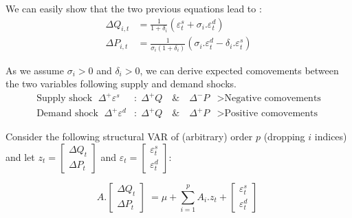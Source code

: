 \noindent We can easily show that the two previous equations lead to :
\begin{align*}
    \Delta Q_{i,t} &= \frac{1}{1+\delta_{i}}(\varepsilon_{t}^{s} + \sigma_{i}.\varepsilon_{t}^{d}) \\
    \Delta P_{i,t} &= \frac{1}{\sigma_{i}(1+\delta_{i})}(\sigma_{i}.\varepsilon_{t}^{d} - \delta_{i}.\varepsilon_{t}^{s})
\end{align*}

\noindent As we assume $\sigma_{i}>0$ and $\delta_{i}>0$, we can derive expected comovements between the two variables following supply and demand shocks.
\begin{align*}
    \textrm{Supply shock } \; \Delta^{+}\varepsilon^{s} &: \; \Delta^{+}Q \quad \textrm{\&} \quad \Delta^{-}P &> \textrm{Negative comovements}\\
    \textrm{Demand shock } \; \Delta^{+}\varepsilon^{d} &: \; \Delta^{+}Q \quad \textrm{\&} \quad \Delta^{+}P &> \textrm{Positive comovements}
\end{align*}


\noindent Consider the following structural VAR of (arbitrary) order $p$ (dropping $i$ indices) and let $z_{t} = \begin{bmatrix} \Delta Q_{t} \\ \Delta P_{t} \end{bmatrix}$ and $\varepsilon_{t} = \begin{bmatrix} \varepsilon_{t}^{s} \\ \varepsilon_{t}^{d} \end{bmatrix}$:
\vspace*{.5cm}

\[
    A.\begin{bmatrix} \Delta Q_{t} \\ \Delta P_{t} \end{bmatrix} \;
    = \mu + \sum_{i=1}^{p}A_{i}.z_{t} + \begin{bmatrix} \varepsilon_{t}^{s} \\ \varepsilon_{t}^{d} \end{bmatrix}\;
\]

